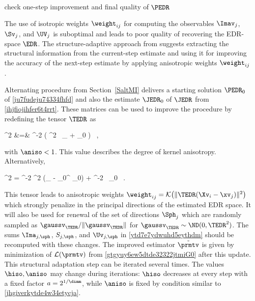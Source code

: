 {\color{blue} check one-step improvement and final quality of \( \PEDR \)}


\label{SEDRsa}
The use of isotropic weights \( \weight_{ij} \) for computing the observables 
\( \Imav_{j} \), \( \Sv_{j} \), and \( \UV_{j} \) is suboptimal and leads to poor 
quality of recovering the EDR-space \( \EDR \).
The structure-adaptive approach from \cite{HJPS} suggests extracting the structural information from the current-step estimate 
and using it for improving the accuracy of the next-step estimate by applying 
anisotropic weights \( \weight_{ij} \).

Alternating procedure from Section~\ref{SaltMI} delivers 
a starting solution \( \PEDR_{0} \) of \eqref{ju7fudeju74334fhfd} and also the estimate \( \JEDR_{0} \) of \( \JEDR \)
from \eqref{ihjfiojihfer6t4rrt}.
These matrices can be used to improve the procedure by redefining the tensor \( \TEDR \) as
\begin{EQA}
	\TEDR^{2}
	&=&
	\hiso^{-2} \bigl( \aniso^{2} \, \Id_{\dimd} + \JEDR_{0} \bigr)
	\, ,
\label{yfijowjdo76dvuienk}
\end{EQA}
with \( \aniso < 1 \).
This value describes the degree of kernel anisotropy.
Alternatively, %
\begin{EQA}[c]
	\TEDR^{2}
	=
	\hiso^{-2} \aniso^{2} (\Id_{\dimd} - \PEDR_{0}^{\T} \PEDR_{0}) + \hiso^{-2} \, \JEDR_{0}
	\, .
\end{EQA}
This tensor leads to anisotropic weights 
\( \weight_{ij} = \Kern\bigl( \| \TEDR(\Xv_{i} - \xv_{j}) \|^{2} \bigr) \)
which strongly penalize in the principal directions of the estimated EDR space.
It will also be used for renewal of the set of directions \( \Sph_{j} \) which are randomly sampled as
\( \gaussv_{\TEDR}/\| \gaussv_{\TEDR} \| \) for \( \gaussv_{\TEDR} \sim \ND(0,\TEDR^{2}) \). 
The sums \( \Ima_{j,\sph} \), \( S_{j,\sph} \), and \( \Uv_{j,\sph} \) in \eqref{ytd7e7ydwuhd5eythdm}
should be recomputed with these changes.
The improved estimator \( \tilde{\prmtv} \) is given by 
minimization of \( \LL(\prmtv) \) from \eqref{gtgyuy6ew5dtde32322jtmiG0}
after this update.
%
This structural adaptation step can be iterated several times.
The values \( \hiso, \aniso \) may change during iterations: 
\( \hiso \) decreases at every step with a fixed factor 
\( a = 2^{1/\dimm} \), while \( \aniso \) is fixed by condition similar to \eqref{jhgiverkytde4w34etycja}.

